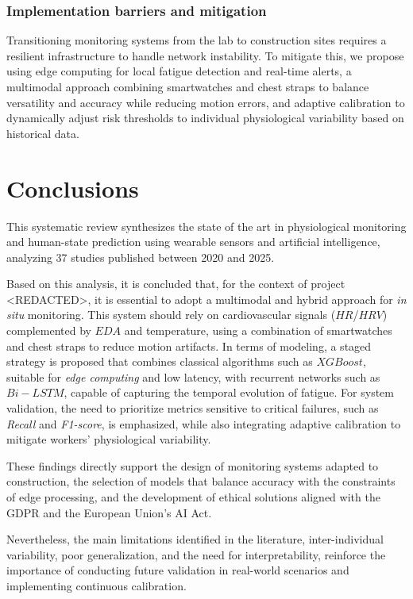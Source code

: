\documentclass[runningheads]{llncs}
\begin{document}
\subsubsection*{Implementation barriers and mitigation}

Transitioning monitoring systems from the lab to construction sites requires a resilient infrastructure to handle network instability. To mitigate this, we propose using edge computing for local fatigue detection and real-time alerts, a multimodal approach combining smartwatches and chest straps to balance versatility and accuracy while reducing motion errors, and adaptive calibration to dynamically adjust risk thresholds to individual physiological variability based on historical data.

\section{Conclusions}

This systematic review synthesizes the state of the art in physiological monitoring and human-state prediction using wearable sensors and artificial intelligence, analyzing 37 studies published between 2020 and 2025.

Based on this analysis, it is concluded that, for the context of project <REDACTED>, it is essential to adopt a multimodal and hybrid approach for \textit{in situ} monitoring. This system should rely on cardiovascular signals ($HR$/$HRV$) complemented by $EDA$ and temperature, using a combination of smartwatches and chest straps to reduce motion artifacts. In terms of modeling, a staged strategy is proposed that combines classical algorithms such as $XGBoost$, suitable for \textit{edge computing} and low latency, with recurrent networks such as $Bi-LSTM$, capable of capturing the temporal evolution of fatigue. For system validation, the need to prioritize metrics sensitive to critical failures, such as \textit{Recall} and \textit{F1-score}, is emphasized, while also integrating adaptive calibration to mitigate workers' physiological variability.

These findings directly support the design of monitoring systems adapted to construction, the selection of models that balance accuracy with the constraints of edge processing, and the development of ethical solutions aligned with the GDPR and the European Union's AI Act.

Nevertheless, the main limitations identified in the literature, inter-individual variability, poor generalization, and the need for interpretability, reinforce the importance of conducting future validation in real-world scenarios and implementing continuous calibration.
\end{document}
